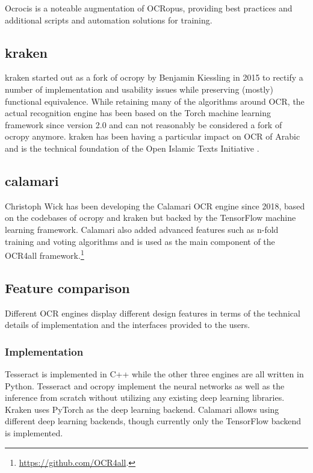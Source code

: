 \documentclass[conference]{IEEEtran}
\begin{document}
Ocrocis is a noteable augmentation of OCRopus, providing best practices and
additional scripts and automation solutions for training.\cite{springmann2015ocrocis}


\subsection{kraken}

kraken \cite{DBLP:journals/corr/RomanovMSK17} started out as a fork of ocropy
by Benjamin Kiessling in 2015 to rectify a number of implementation and usability
issues while preserving (mostly) functional equivalence. While retaining many of
the algorithms around OCR, the actual recognition engine has been based on the
Torch machine learning framework since version 2.0 and can not reasonably be
considered a fork of ocropy anymore. kraken has been having a particular impact
on OCR of Arabic and is the technical foundation of the Open Islamic Texts
Initiative \cite{miller_romanov_savant_2018}.


\subsection{calamari}

Christoph Wick has been developing the Calamari
\cite{DBLP:journals/corr/abs-1807-02004} OCR engine since 2018, based on the
codebases of ocropy and kraken but backed by the TensorFlow machine learning
framework. Calamari also added advanced features such as n-fold training and
voting algorithms and is used as the main component of the OCR4all
framework.\footnote{\url{https://github.com/OCR4all}.}

\subsection{Feature comparison}


Different OCR engines display different design features in terms of the
technical details of implementation and the interfaces provided to the users.

\subsubsection{Implementation}

Tesseract is implemented in C++ while the
other three engines are all written in Python. Tesseract and ocropy
implement the neural networks as well as the inference from scratch without
utilizing any existing deep learning libraries. Kraken uses PyTorch as the
deep learning backend. Calamari allows using different deep learning backends,
though currently only the TensorFlow backend is implemented.
\end{document}
